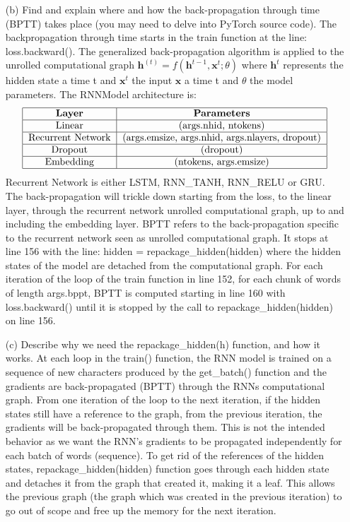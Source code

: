 \documentclass[11pt]{article}
\newcommand{\0}{\mat{0}}
\newcommand{\vect}[1]{\bm{#1}}     %
\begin{document}
\begin{itemize}
           
   \item[(b)]
   Find and explain where and how the back-propagation through time (BPTT) takes place (you may need to delve into PyTorch source code). 
   The backpropagation through time starts in the train function at the line: loss.backward(). The generalized back-propagation algorithm is applied to the unrolled computational graph $\vect{h}^(t) = f(\vect{h}^{t-1}, \vect{x}^t; \theta)$ where $\vect{h}^t$ represents the hidden state a time t and $\vect{x}^t$ the input $\vect{x}$ a time t and $\theta$ the model parameters.
   The RNNModel architecture is:
   \[
  	 \begin{tabular}{| c | c | c |}
  	  \hline
	  \textbf{Layer} & \textbf{Parameters}  \\
	  \hline
	  \text{Linear} & \text{(args.nhid, ntokens)}  \\
	  \hline
	  \text{Recurrent Network} & \text{(args.emsize, args.nhid, args.nlayers, dropout)}  \\
	  \hline
	  \text{Dropout} & \text{(dropout)} \\
	  \hline
	  \text{Embedding} & \text{(ntokens, args.emsize)}  \\
	  \hline
	\end{tabular}
\] 
Recurrent Network is either LSTM, RNN\_TANH, RNN\_RELU or GRU. The back-propagation will trickle down starting from the loss, to the linear layer, through the recurrent network unrolled computational graph, up to and including the embedding layer. BPTT refers to the back-propagation specific to the recurrent network seen as unrolled computational graph. It stops at line 156 with the line: hidden = repackage\_hidden(hidden) where the hidden states of the model are detached from the computational graph. For each iteration of the loop of the train function in line 152, for each chunk of words of length args.bppt, BPTT is computed  starting in line 160 with loss.backward() until it is stopped by the call to repackage\_hidden(hidden) on line 156.
	
    \item[(c)]      
    Describe why we need the repackage\_hidden(h) function, and how it works.
 At each loop in the train() function, the RNN model is trained on a sequence of new characters produced by the  get\_batch() function and the gradients are back-propagated (BPTT) through the RNNs computational graph. From one iteration of the loop to the next iteration, if the hidden states still have a reference to the graph, from the previous iteration, the gradients will be back-propagated through them. This is not the intended behavior as we want the RNN's gradients to be propagated independently for each batch of words (sequence). To get rid of the references of the hidden states, repackage\_hidden(hidden) function  goes through each hidden state and detaches it from the graph that created it, making it a leaf. This allows the previous graph (the graph which was created in the previous iteration) to go out of scope and free up the memory for the next iteration.
    

\end{itemize}
\end{document}
